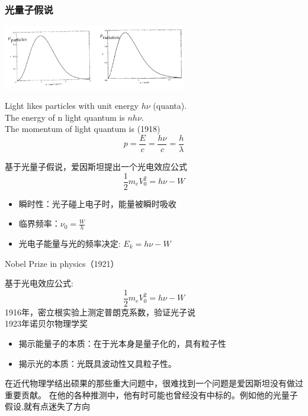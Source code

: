 \begin{frame}  
    \frametitle{光量子假说}  
    \begin{center}
        \includegraphics[width=0.6\textwidth]{figs/mbd.png}
    \end{center}
    \begin{tcolorbox}[colback=yellow!10,colframe=red!75!black,title=]
        \bullet Light likes particles with unit energy $h\nu$ (quanta).\\  
        \bullet The energy of n light quantum is $nh\nu$. \\
        \bullet The momentum of light quantum is (1918)
        \[p=\frac{E}{c}=\frac{h\nu}{c}=\frac{h}{\lambda}\]
    \end{tcolorbox}
\end{frame}



\begin{frame} 
    基于光量子假说，爱因斯坦提出一个光电效应公式
    $$
    \frac{1}{2}m_eV_0^2=h\nu-W
    $$
    \begin{itemize}
        \item 瞬时性：光子碰上电子时，能量被瞬时吸收
        \item 临界频率：$\nu_0=\frac{W}{h} $
        \item 光电子能量与光的频率决定: $E_k=h\nu-W$
    \end{itemize}
    {\color{deepred} Nobel Prize in physics（1921）}
\end{frame}

\begin{frame} 
    基于光电效应公式:
$$
\frac{1}{2}m_eV_0^2=h\nu-W
$$
1916年，密立根实验上测定普朗克系数，验证光子说\\
1923年诺贝尔物理学奖 
\end{frame}

\begin{frame} 
    \begin{tcolorbox}[colback=yellow!10,colframe=red!75!black,title=意义：]
        \begin{itemize}
            \item 揭示能量子的本质：在于光本身是量子化的，具有粒子性
            \item 揭示光的本质：光既具波动性又具粒子性。
        \end{itemize}
    \end{tcolorbox}
    \begin{tcolorbox}[colback=yellow!10,colframe=red!20!black,title=普朗克的评价：]
    在近代物理学结出硕果的那些重大问题中，很难找到一个问题是爱因斯坦没有做过重要贡献。
    在他的各种推测中，他有时可能也曾经没有中标的。例如他的光量子假设,就有点迷失了方向 
    \end{tcolorbox}
\end{frame}

